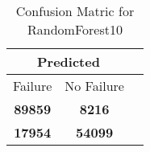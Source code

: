 \begin{table}[] 
\caption{Confusion Matric for RandomForest10} 
\label{Table: Prediction Accuracy-DMDRandomForest10OnlySunEKF-ignoreReflectionEKF-top2-Reflection} 
\centering 
\begin{tabular} 
 {@{}ccc@{}} 
\toprule 
\multicolumn{2}{c}{\textbf{Predicted}}
 \\ \midrule 
\multicolumn{1}{|c|}{Failure} & 
\multicolumn{1}{c|}{No Failure}
 \\ \midrule 
\multicolumn{1}{|c|}{\color{green}\textbf{89859}} & 
\multicolumn{1}{c|}{\color{red}\textbf{8216}}
 \\ \midrule 
\multicolumn{1}{|c|}{\color{red}\textbf{17954}} & 
\multicolumn{1}{c|}{\color{green}\textbf{54099}}
 \\ \bottomrule 
\end{tabular} 
\end{table} 
